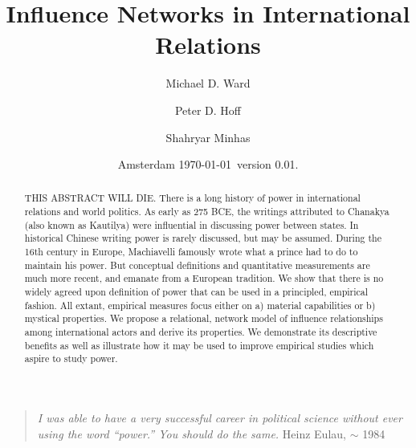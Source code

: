 \documentclass[12pt,oneside,doublespace,pdflatex]{amsart}
\date{Amsterdam \today~version 0.01.}
\begin{document}
\title[Not Power]{Influence Networks in International Relations}

\author{Michael D. Ward}
\address{Michael D. Ward: Department of Political Science, Duke University, Durham, NC, USA, 27707\\}
 
\author{Peter D. Hoff}
\address{Peter D. Hoff: Department of Statistics, University of Washington, Seattle, WA, USA, 98195}

\author{Shahryar Minhas}
\address{Shahryar Minhas: Department of Political Science, Duke University, Durham, NC, USA, 27707\\}

\begin{abstract} THIS ABSTRACT WILL DIE.
There is a long history of power in international relations and world politics. As early as 275 BCE, the writings attributed to Chanakya (also known as Kautilya) were influential in discussing power between states.  In historical Chinese writing power is rarely discussed, but may be assumed. During the 16th century in Europe, Machiavelli famously wrote what a prince had to do to maintain his power. But conceptual definitions and quantitative measurements are much more recent, and emanate from a European tradition.  We show that there is no widely agreed upon definition of power that can be used in a principled, empirical fashion.  All extant, empirical measures focus either on a) material capabilities or b) mystical properties. We propose a relational, network model of influence relationships among international actors and derive its properties. We demonstrate its descriptive benefits as well as illustrate how it may be used to improve empirical studies which aspire to study power.
\end{abstract}
 
\pagestyle{fancy} \chead{} \rhead{}
  \rfoot{}

\maketitle

\begin{quote} {\em
I was able to have a very successful career in political science without ever using the word ``power.'' You should do the same.}  Heinz Eulau,  $\sim$ 1984
\end{quote}
\end{document}
